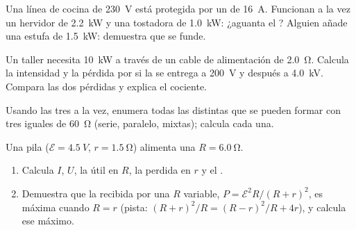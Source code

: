 \begin{exercise}[$\star\star$]\label{exo:g11:circuits-and-power:10}
Una línea de cocina de \qty{230}{V} está protegida por un  de
\qty{16}{A}. Funcionan a la vez un hervidor de \qty{2.2}{kW} y una
tostadora de \qty{1.0}{kW}: ¿aguanta el ? Alguien añade una
estufa de \qty{1.5}{kW}: demuestra que se funde.
\end{exercise}

\begin{exercise}[$\star\star$]\label{exo:g11:circuits-and-power:11}
Un taller necesita \qty{10}{kW} a través de un cable de alimentación de
 \qty{2.0}{\ohm}. Calcula la intensidad y la pérdida por
 si la  se entrega a \qty{200}{V} y después a
\qty{4.0}{kV}. Compara las dos pérdidas y explica el cociente.
\end{exercise}

\begin{exercise}[$\star\star\star$]\label{exo:g11:circuits-and-power:12}
Usando las tres a la vez, enumera todas las 
distintas que se pueden formar con tres  iguales de
\qty{60}{\ohm} (serie, paralelo, mixtas); calcula cada una.
\end{exercise}

\begin{exercise}[$\star\star\star$]\label{exo:g11:circuits-and-power:13}
Una pila ($\mathcal{E} = \qty{4.5}{V}$, $r = \qty{1.5}{\ohm}$) alimenta
una  $R = \qty{6.0}{\ohm}$.
\begin{enumerate}
  \item Calcula $I$, $U$, la  útil en $R$, la  perdida
        en $r$ y el .
  \item Demuestra que la  recibida por una $R$ variable,
        $P = \mathcal{E}^2 R/(R+r)^2$, es máxima cuando $R = r$ (pista:
        $(R+r)^2/R = (R-r)^2/R + 4r$), y calcula ese máximo.
\end{enumerate}
\end{exercise}

